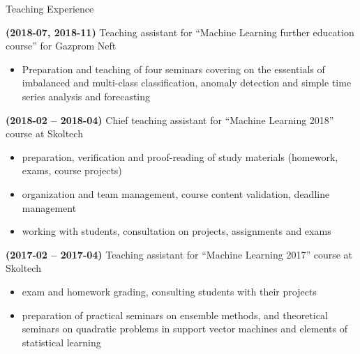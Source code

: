 \documentclass{resume} %
\begin{document}
\begin{rSection}{Teaching Experience}
    \item \textbf{(2018-07, 2018-11)} %
    Teaching assistant for ``Machine Learning further education course'' for Gazprom Neft
    \begin{itemize}
        \item Preparation and teaching of four seminars covering on the essentials of imbalanced and multi-class classification, anomaly detection and simple time series analysis and forecasting
    \end{itemize}

    \item \textbf{(2018-02 -- 2018-04)}
    Chief teaching assistant for ``Machine Learning 2018'' course at Skoltech
    \begin{itemize}
        \item preparation, verification and proof-reading of study materials (homework, exams, course projects)
        
        \item organization and team management, course content validation, deadline management
        
        \item working with students, consultation on projects, assignments and exams
    \end{itemize}

    \item \textbf{(2017-02 -- 2017-04)}
    Teaching assistant for ``Machine Learning 2017'' course at Skoltech
    \begin{itemize}
        \item exam and homework grading, consulting students with their projects

        \item preparation of practical seminars on ensemble methods, and theoretical seminars on quadratic problems in support vector machines and elements of statistical learning
    \end{itemize}
\end{rSection}
\end{document}

